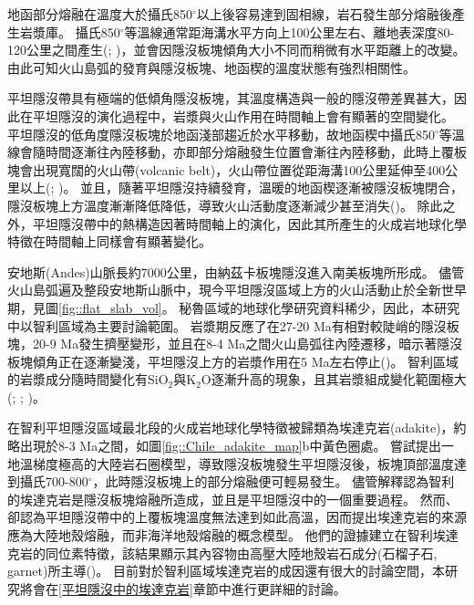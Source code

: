 地函部分熔融在溫度大於攝氏850$^{\circ}$以上後容易達到固相線，岩石發生部分熔融後產生岩漿庫。
攝氏850$^{\circ}$等溫線通常距海溝水平方向上100公里左右、離地表深度80-120公里之間產生(\citealp{peacock1990fluid}; \citealp{hyndman2003serpentinization})，並會因隱沒板塊傾角大小不同而稍微有水平距離上的改變。
由此可知火山島弧的發育與隱沒板塊、地函楔的溫度狀態有強烈相關性。

平坦隱沒帶具有極端的低傾角隱沒板塊，其溫度構造與一般的隱沒帶差異甚大，因此在平坦隱沒的演化過程中，岩漿與火山作用在時間軸上會有顯著的空間變化。
平坦隱沒的低角度隱沒板塊於地函淺部趨近於水平移動，故地函楔中攝氏850$^{\circ}$等溫線會隨時間逐漸往內陸移動，亦即部分熔融發生位置會漸往內陸移動，此時上覆板塊會出現寬闊的火山帶(volcanic belt)，火山帶位置從距海溝100公里延伸至400公里以上(\citealp{Gutscher2000A}; \citealp{Manea2017})。
並且，隨著平坦隱沒持續發育，溫暖的地函楔逐漸被隱沒板塊閉合，隱沒板塊上方溫度漸漸降低降低，導致火山活動度逐漸減少甚至消失(\citealp{Gutscher2000Bcan})。
除此之外，平坦隱沒帶中的熱構造因著時間軸上的演化，因此其所產生的火成岩地球化學特徵在時間軸上同樣會有顯著變化。

安地斯(Andes)山脈長約7000公里，由納茲卡板塊隱沒進入南美板塊所形成。
儘管火山島弧遍及整段安地斯山脈中，現今平坦隱沒區域上方的火山活動止於全新世早期，見圖\ref{fig::flat_slab_vol}。
秘魯區域的地球化學研究資料稀少，因此，本研究中以智利區域為主要討論範圍。
岩漿期反應了在27-20 Ma有相對較陡峭的隱沒板塊，20-9 Ma發生擠壓變形，並且在8-4 Ma之間火山島弧往內陸遷移，暗示著隱沒板塊傾角正在逐漸變淺，平坦隱沒上方的岩漿作用在5 Ma左右停止(\citealp{kay2002magmatism})。
智利區域的岩漿成分隨時間變化有SiO$_2$與K$_2$O逐漸升高的現象，且其岩漿組成變化範圍極大(\citealp{kay1988tertiary}; \citealp{kay2002magmatism}; \citealp{goss2013andean})。

在智利平坦隱沒區域最北段的火成岩地球化學特徵被歸類為埃達克岩(adakite)，約略出現於8-3 Ma之間，如圖\ref{fig::Chile_adakite_map}b中黃色圈處。
\citet{Gutscher2000Bcan}嘗試提出一地溫梯度極高的大陸岩石圈模型，導致隱沒板塊發生平坦隱沒後，板塊頂部溫度達到攝氏700-800$^{\circ}$，此時隱沒板塊上的部分熔融便可輕易發生。
儘管\citet{Gutscher2000Bcan}解釋認為智利的埃達克岩是隱沒板塊熔融所造成，並且是平坦隱沒中的一個重要過程。
然而\citet{kay2002magmatism}、\citet{goss2013andean}卻認為平坦隱沒帶中的上覆板塊溫度無法達到如此高溫，因而提出埃達克岩的來源應為大陸地殼熔融，而非海洋地殼熔融的概念模型。
他們的證據建立在智利埃達克岩的同位素特徵，該結果顯示其內容物由高壓大陸地殼岩石成分(石榴子石, garnet)所主導(\citealp{kay2002magmatism})。
目前對於智利區域埃達克岩的成因還有很大的討論空間，本研究將會在\ref{平坦隱沒中的埃達克岩}章節中進行更詳細的討論。

